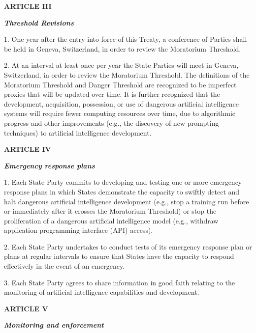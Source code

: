 \documentclass[12pt,a4paper]{article}
\begin{document}
\begin{center}
    
\textbf{{ARTICLE III}}

\textit{\textbf{Threshold Revisions}}
\end{center}

1. One year after the entry into force of this Treaty, a conference of Parties shall be held in Geneva, Switzerland, in order to review the Moratorium Threshold.  

2. At an interval at least once per year the State Parties will meet in Geneva, Switzerland, in order to review the Moratorium Threshold. The definitions of the Moratorium Threshold and Danger Threshold are recognized to be imperfect proxies that will be updated over time. It is further recognized that the development, acquisition, possession, or use of dangerous artificial intelligence systems will require fewer computing resources over time, due to algorithmic progress and other improvements (e.g., the discovery of new prompting techniques) to artificial intelligence development. 

 \begin{center}
    
\textbf{{ARTICLE IV}}

\textit{\textbf{Emergency response plans}}

\end{center}

1. Each State Party commits to developing and testing one or more emergency response plans in which States demonstrate the capacity to swiftly detect and halt dangerous artificial intelligence development (e.g., stop a training run before or immediately after it crosses the Moratorium Threshold) or stop the proliferation of a dangerous artificial intelligence model (e.g., withdraw application programming interface (API) access). 

2. Each State Party undertakes to conduct tests of its emergency response plan or plans at regular intervals to ensure that States have the capacity to respond effectively in the event of an emergency. 

3. Each State Party agrees to share information in good faith relating to the monitoring of artificial intelligence capabilities and development. 

  \begin{center}
    
\textbf{{ARTICLE V}}

\textbf{\textit{Monitoring and enforcement}}

\end{center}
\end{document}
